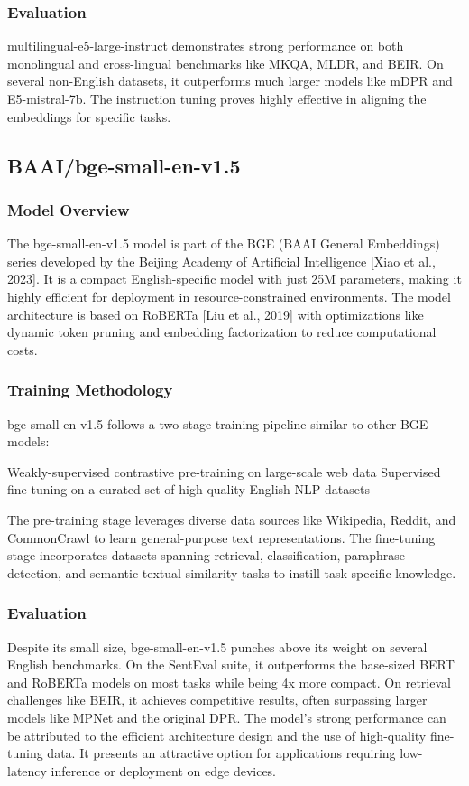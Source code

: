 \subsubsection{Evaluation}
multilingual-e5-large-instruct demonstrates strong performance on both monolingual and cross-lingual benchmarks like MKQA, MLDR, and BEIR. On several non-English datasets, it outperforms much larger models like mDPR and E5-mistral-7b. The instruction tuning proves highly effective in aligning the embeddings for specific tasks.

\subsection{BAAI/bge-small-en-v1.5}\label{subsec:baai}

\subsubsection{Model Overview}
The bge-small-en-v1.5 model is part of the BGE (BAAI General Embeddings) series developed by the Beijing Academy of Artificial Intelligence [Xiao et al., 2023]. It is a compact English-specific model with just 25M parameters, making it highly efficient for deployment in resource-constrained environments. The model architecture is based on RoBERTa [Liu et al., 2019] with optimizations like dynamic token pruning and embedding factorization to reduce computational costs.

\subsubsection{Training Methodology}
bge-small-en-v1.5 follows a two-stage training pipeline similar to other BGE models:

Weakly-supervised contrastive pre-training on large-scale web data
Supervised fine-tuning on a curated set of high-quality English NLP datasets

The pre-training stage leverages diverse data sources like Wikipedia, Reddit, and CommonCrawl to learn general-purpose text representations. The fine-tuning stage incorporates datasets spanning retrieval, classification, paraphrase detection, and semantic textual similarity tasks to instill task-specific knowledge.

\subsubsection{Evaluation}
Despite its small size, bge-small-en-v1.5 punches above its weight on several English benchmarks.
On the SentEval suite, it outperforms the base-sized BERT and RoBERTa models on most tasks while being 4x more compact.
On retrieval challenges like BEIR, it achieves competitive results, often surpassing larger models like MPNet and the original DPR.
The model's strong performance can be attributed to the efficient architecture design and the use of high-quality fine-tuning data.
It presents an attractive option for applications requiring low-latency inference or deployment on edge devices.

